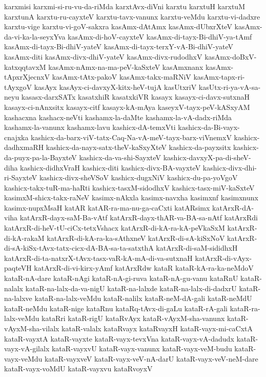 {karxmisi
karxmi-si-ru-vu-da-riMda
karxtAvx-diVni
karxtu
karxtuH
karxtuM
karxtunA
karxtu-ru-cayxteV
karxtu-tavx-vanunx
karxtu-veMdu
karxtu-vi-dadxre
karxtu-vige
karxtu-vi-goV-sakxra
kasAmx-dAtAmx
kasAmx-dUbxrXteV
kasAmx-da-vi-ka-la-seyxYva
kasAmx-di-hoV-cayxteV
kasAmx-di-tayx-Bi-dhiV-ya-tAmf
kasAmx-di-tayx-Bi-dhiV-yateV
kasAmx-di-tayx-terxY-vA-Bi-dhiV-yateV
kasAmx-diti
kasAmx-divx-dhiV-yateV
kasAmx-divx-rudodhxV
kasAmx-doBxV-katxqqtavxM
kasAmx-nAmx-na-ma-peV-kaSxteV
kasAmxnanx
kasAmx-tApxrXjecnxV
kasAmx-tAtx-pakoV
kasAmx-takx-maRNiV
kasAmx-tapx-ri-tAyxgoV
kasAyx
kasAyx-ci-davxyX-kitx-heV-tujA
kasUtxriV
kasUtx-ri-ya-vA-sa-neyu
kasasx-darxSATx
kasatxhiR
kasatxkiVR
kasayx
kasayx-ci-davx-sutxnaH
kasayx-ci-nAnxsitx
kasayx-citf
kasayx-kA-mAya
kaseyxV-tayx-peV-kASxyAM
kashacxna
kashacx-neVti
kashamx-la-daMte
kashamx-la-vA-dadx-riMda
kashamx-la-vanunx
kashamx-lavu
kashicx-dA-temxVti
kashicx-da-Bi-vayx-cnajxka
kashicx-da-barx-viV-tatx-Caq-Na-vA-meV-tayx-barx-viVnemxV
kashicx-dadhxmaRH
kashicx-da-nayx-satx-theV-kaSxyXteV
kashicx-da-payxsitx
kashicx-da-puyx-pa-la-BayxteV
kashicx-da-va-shi-SayxteV
kashicx-davxyX-pa-di-sheV-diha
kashicx-didhxVraH
kashicx-diti
kashicx-divx-BA-vayxteV
kashicx-divx-dhi-ri-SayxteV
kashicx-divx-sheVSoV
kashicx-dugxNiV
kashicx-du-pa-yoVgoV
kashicx-takx-tuR-ma-haRti
kashicx-tasxM-sidodhxV
kashicx-tasx-miV-kaSxteV
kasimxM-shicx-takx-raNeV
kasimx-nAkxla
kasimx-navxha
kasimxnf
kasimxnunx
kasimx-nupxMsaH
katAR
katAR-ra-ma-nu-ga-caCxti
katARsimx
katArxR-dA-viha
katArxR-dayx-saM-Ba-vAtf
katArxR-dayx-thAR-va-BA-sa-nAtf
katArxRdi
katArxR-di-heV-tU-ciCx-tetxVshacx
katArxR-di-kA-ra-kA-peVkaSxM
katArxR-di-kA-rakaM
katArxR-di-kA-ra-ka-sAthxneV
katArxR-di-sA-kiSxNoV
katArxR-di-sA-kiSx-tAvx-tatx-cicx-dA-BA-sa-ta-satxthA
katArxR-di-saM-sididhxH
katArxR-di-ta-natxrX-tAvx-tasx-vaR-kA-mA-di-va-sutxnaH
katArxR-di-vAyx-paqteVH
katArxR-di-vi-kirx-yAmf
katArxRdw
kataR
kataR-kA-ra-ka-neMdoV
kataR-nA-dare
kataR-nAgi
kataR-nA-gi-ruva
kataR-nA-gu-vanu
kataRnU
kataR-nalalx
kataR-na-lalx-da-va-nigU
kataR-na-lalxde
kataR-na-lalx-di-dadxrU
kataR-na-lalxve
kataR-na-lalx-veMdu
kataR-nalilx
kataR-neM-dA-gali
kataR-neMdU
kataR-neMdu
kataR-nige
kataRnu
kataRq-tAvx-di-gaLu
kataR-rA-gali
kataR-ra-lalx-veMdu
kataRri
kataR-rigU
kataRvAyx
kataR-vAyxM-sha-vanunx
kataR-vAyxM-sha-vilalx
kataR-valalx
kataRvayx
kataRvayxH
kataR-vayx-mi-caCxtA
kataR-vayxtA
kataR-vayxte
kataR-vayx-tevxVna
kataR-vayx-vA-dadudx
kataR-vayx-vA-gilalx
kataR-vayxvU
kataR-vayx-vanunx
kataR-vayx-veM-budu
kataR-vayx-veMdu
kataR-vayxveV
kataR-vayx-veV-nA-darU
kataR-vayx-veV-neM-dare
kataR-vayx-voMdU
kataR-vayxvu
kataRvoyxV
}
